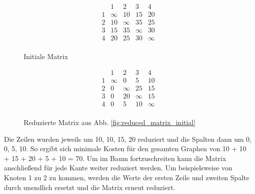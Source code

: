 \begin{figure}[H]
\centering
\begin{minipage}{.5\textwidth}
  \centering
  \[
    \begin{matrix}
          & 1 & 2 & 3 & 4\\
        1 & \infty & 10 & 15 & 20\\
        2 & 10 & \infty & 35 & 25\\
        3 & 15 & 35 & \infty & 30\\
        4 & 20 & 25 & 30 & \infty\\
    \end{matrix}
    \]
    \caption{Initiale Matrix \cite{geeksForGeeksRm}}
    \label{fig:reduced_matrix_initial}
\end{minipage}%
\begin{minipage}{.5\textwidth}
  \centering
   \[
    \begin{matrix}
          & 1 & 2 & 3 & 4\\
        1 & \infty & 0 & 5 & 10\\
        2 & 0 & \infty & 25 & 15\\
        3 & 0 & 20 & \infty & 15\\
        4 & 0 & 5 & 10 & \infty\\
    \end{matrix}
    \]
    \caption{Reduzierte Matrix aus Abb. \ref{fig:reduced_matrix_initial} \cite{geeksForGeeksRm}}
    \label{fig:reduced_matrix_reduced}
\end{minipage}
\end{figure}

Die Zeilen wurden jeweils um 10, 10, 15, 20 reduziert und die Spalten dann um 0, 0, 5, 10. So ergibt sich minimale Kosten für den gesamten Graphen von 10 + 10 + 15 + 20 + 5 + 10 = 70. Um im Baum fortzuschreiten kann die Matrix anschließend für jede Kante weiter reduziert werden. Um beispielsweise von Knoten 1 zu 2 zu kommen, werden die Werte der ersten Zeile und zweiten Spalte durch unendlich ersetzt und die Matrix erneut reduziert. 

